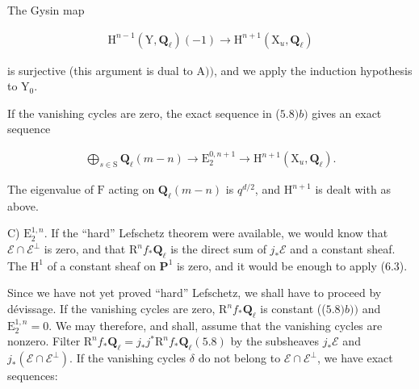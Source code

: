 \documentclass[10pt,leqno]{article}
\begin{document}
\begingroup\setlength{\parskip}{.20em}\setlength{\abovedisplayskip}{4pt}\setlength{\belowdisplayskip}{4pt}\setlength{\abovedisplayshortskip}{2pt}\setlength{\belowdisplayshortskip}{2pt}

\label{physical-29}\setcounter{page}{300}

\noindent The Gysin map\par

\begin{equation*}\begin{gathered}\mathrm{H}^{n- 1}(\mathrm{Y},\mathbf{Q}_{\ell })(- 1) \longrightarrow  \mathrm{H}^{n+1}(\mathrm{X}_{u},\mathbf{Q}_{\ell })\end{gathered}\end{equation*}

\noindent is surjective (this argument is dual to \(\mathrm{A}))\), and we apply the induction hypothesis to \(\mathrm{Y}_{0}\).\par

\noindent If the vanishing cycles are zero, the exact sequence in (\(5.8) b)\) gives an exact sequence\par

\begin{equation*}\begin{gathered}\bigoplus\limits_{s\in \mathrm{S}}\mathbf{Q}_{\ell }(m- n) \longrightarrow  \mathrm{E}_{2}^{0,n+1} \longrightarrow  \mathrm{H}^{n+1}(\mathrm{X}_{u},\mathbf{Q}_{\ell }).\end{gathered}\end{equation*}

\noindent The eigenvalue of \(\mathrm{F}\) acting on \(\mathbf{Q}_{\ell }(m- n)\) is \(q^{d/2}\), and \(\mathrm{H}^{n+1}\) is dealt with as above.\par

\noindent C) \(\mathrm{E}_{2}^{1,n}\). If the “hard” Lefschetz theorem were available, we would know that \(\mathcal{E} \cap \mathcal{E} ^{\perp }\) is zero, and that \(\mathrm{R}^{n} f_{*}\mathbf{Q}_{\ell }\) is the direct sum of \(j_{*}\mathcal{E} \) and a constant sheaf. The \(\mathrm{H}^{1}\) of a constant sheaf on \(\mathbf{P}^{1}\) is zero, and it would be enough to apply (6.3).\par

\noindent Since we have not yet proved “hard” Lefschetz, we shall have to proceed by dévissage. If the vanishing cycles are zero, \(\mathrm{R}^{n} f_{*}\mathbf{Q}_{\ell }\) is constant ((\(5.8) b))\) and \(\mathrm{E}_{2}^{1,n}=0\). We may therefore, and shall, assume that the vanishing cycles are nonzero. Filter \(\mathrm{R}^{n} f_{*}\mathbf{Q}_{\ell }=j_{*}j^{*}\mathrm{R}^{n} f_{*}\mathbf{Q}_{\ell } (5.8)\) by the subsheaves \(j_{*}\mathcal{E} \) and \(j_{*}(\mathcal{E} \cap \mathcal{E} ^{\perp })\). If the vanishing cycles \(\delta \) do not belong to \(\mathcal{E} \cap \mathcal{E} ^{\perp }\), we have exact sequences:\par
\end{document}
